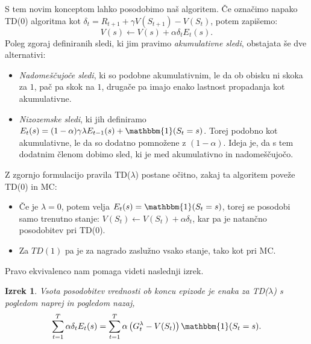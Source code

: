 \documentclass[12pt,a4paper]{amsart}
\theoremstyle{definition} %
\theoremstyle{plain} %
\newtheorem{izrek}[definicija]{Izrek}
\begin{document}
S tem novim konceptom lahko posodobimo naš algoritem. Če označimo napako TD($0$) algoritma kot 
$\delta_t = R_{t+1} + \gamma V(S_{t+1}) - V(S_t)$, potem zapišemo: 
\begin{equation}\label{TDlambda}
    V(s) \leftarrow V(s) + \alpha \delta_t E_t(s).
\end{equation}
Poleg zgoraj definiranih sledi, ki jim pravimo \textit{akumulativne sledi}, obstajata še dve 
alternativi:

\begin{itemize}
    \item \textit{Nadomeščujoče sledi}, ki so podobne akumulativnim, le da ob obisku ni skoka za 
            $1$, pač pa skok na $1$, drugače pa imajo enako lastnost propadanja kot akumulativne. 
    \item \textit{Nizozemske sledi}, ki jih definiramo $E_t(s) = (1 - \alpha) \gamma \lambda 
            E_{t-1}(s) + \mathbbm{1}(S_t = s)$. Torej podobno kot akumulativne, le da so dodatno 
            pomnožene z $(1 - \alpha)$. Ideja je, da s tem dodatnim členom dobimo sled, ki je med 
            akumulativno in nadomeščujočo.
\end{itemize}

Z zgornjo formulacijo pravila TD($\lambda$) postane očitno, zakaj ta algoritem poveže TD($0$) in MC:

\begin{itemize}
    \item Če je $\lambda = 0$, potem velja $E_t(s) = \mathbbm{1}(S_t = s)$, torej se posodobi samo
            trenutno stanje: $V(S_t) \leftarrow V(S_t) + \alpha \delta_t$, kar pa je natančno 
            posodobitev pri TD($0$).
    \item Za $TD(1)$ pa je za nagrado zaslužno vsako stanje, tako kot pri MC. 
\end{itemize}
Pravo ekvivalenco nam pomaga videti naslednji izrek.

\begin{izrek}
    Vsota posodobitev vrednosti ob koncu epizode je enaka za TD($\lambda$) s pogledom naprej in 
    pogledom nazaj,
    $$
    \sum_{t=1}^T \alpha \delta_t E_t(s) = \sum_{t=1}^T \alpha \left( G_t^\lambda - V(S_t) \right) 
    \mathbbm{1}(S_t = s).
    $$
\end{izrek}
\end{document}
